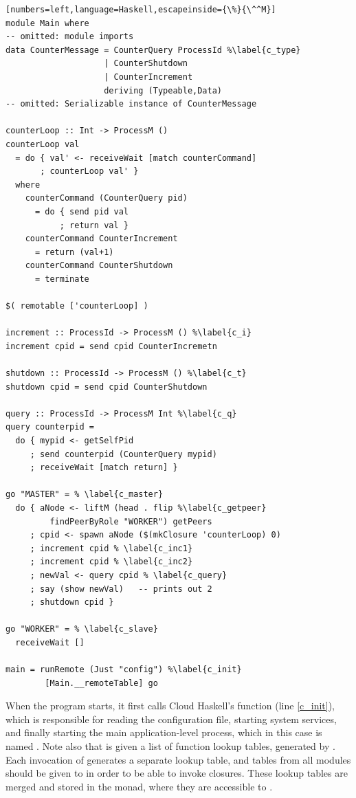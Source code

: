 \documentclass[preprint]{sigplanconf}
\newcommand\je[1]{\nb{jeff}{#1}}
\begin{document}
\begin{lstlisting}[numbers=left,language=Haskell,escapeinside={\%}{\^^M}]
module Main where
-- omitted: module imports
data CounterMessage = CounterQuery ProcessId %\label{c_type}
                    | CounterShutdown
                    | CounterIncrement 
                    deriving (Typeable,Data)
-- omitted: Serializable instance of CounterMessage

counterLoop :: Int -> ProcessM ()
counterLoop val
  = do { val' <- receiveWait [match counterCommand]
       ; counterLoop val' }
  where
    counterCommand (CounterQuery pid) 
      = do { send pid val
           ; return val }
    counterCommand CounterIncrement 
      = return (val+1)
    counterCommand CounterShutdown
      = terminate

$( remotable ['counterLoop] )

increment :: ProcessId -> ProcessM () %\label{c_i}
increment cpid = send cpid CounterIncremetn

shutdown :: ProcessId -> ProcessM () %\label{c_t}
shutdown cpid = send cpid CounterShutdown

query :: ProcessId -> ProcessM Int %\label{c_q}
query counterpid =
  do { mypid <- getSelfPid
     ; send counterpid (CounterQuery mypid)
     ; receiveWait [match return] }

go "MASTER" = % \label{c_master}
  do { aNode <- liftM (head . flip %\label{c_getpeer}
         findPeerByRole "WORKER") getPeers
     ; cpid <- spawn aNode ($(mkClosure 'counterLoop) 0)
     ; increment cpid % \label{c_inc1}
     ; increment cpid % \label{c_inc2}
     ; newVal <- query cpid % \label{c_query}
     ; say (show newVal)   -- prints out 2
     ; shutdown cpid }

go "WORKER" = % \label{c_slave}
  receiveWait []

main = runRemote (Just "config") %\label{c_init}
        [Main.__remoteTable] go
\end{lstlisting}

When the program starts, it first calls Cloud Haskell's \je{I am still not totally sold on this name} function  (line \ref{c_init}), which is responsible for reading the configuration file, starting system services, and finally starting the main application-level process, which in this case is named . Note also that  is given a list of function lookup tables, generated by . Each invocation of  generates a separate lookup table, and tables from all modules should be given to  in order to be able to invoke closures. These lookup tables are merged and stored in the  monad, where they are accessible to .
\end{document}
